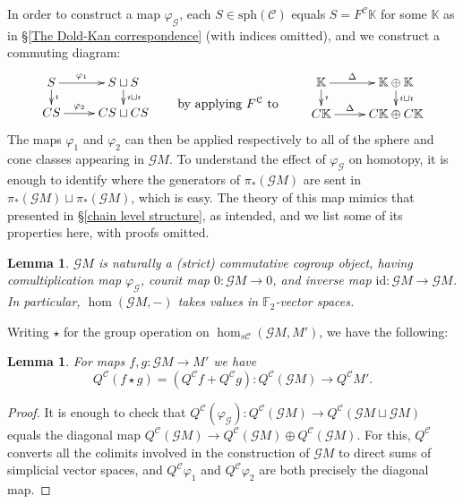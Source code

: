 \documentclass[11pt]{amsart} \renewcommand{\baselinestretch}{1.2}
\theoremstyle{plain}
\newtheorem{lem}[thm]{Lemma}
\theoremstyle{definition}
\newcommand{\DASH}{\mathrm{-}}
\let\phi\varphi
\renewcommand{\to}{\longrightarrow}
\newcommand{\scrG}{\mathscr{G}}
\newcommand{\calV}{\mathcal{V}}
\newcommand{\calc}{\mathcal{C}}
\newcommand{\spheres}[1]{\mathrm{sph}(#1)}
\newcommand{\vect}[2]{\calV^{#1}_{#2}}
\newcommand{\BSW}{{\scrG}}
\newcommand{\F}{\mathbb{F}}
\newcommand{\Id}{\mathrm{id}}
\newcommand{\Ftwo}{\F_2}
\begin{document}
\begin{Composite functor spectral sequences}
In order to construct a map $\phi_\BSW $, each $S\in\spheres{\calc}$ equals $S=F^\calc\mathbb{K}$ for some $\mathbb{K}$ as in \S\ref{The Dold-Kan correspondence} (with indices omitted), and we construct a commuting diagram:
\[\xymatrix@R=4mm{
S\ar[r]^-{\phi_1}
\ar[d]^-{\imath}
&%
S\sqcup S\ar[d]^-{\imath\sqcup\imath}
\\%
CS\ar[r]^-{\phi_2}
&%
CS\sqcup CS%
}\qquad \textup{\raisebox{-6mm}{by applying $F^\calc$ to }}\qquad \xymatrix@R=4mm{
\mathbb{K}\ar[r]^-{\Delta}
\ar[d]^-{\imath}
&%
\mathbb{K}\oplus \mathbb{K}\ar[d]^-{\imath\sqcup\imath}
\\%
C\mathbb{K}\ar[r]^-{\Delta}
&%
C\mathbb{K}\oplus C\mathbb{K}%
}\]
The maps $\phi_1$ and $\phi_2$ can then be applied respectively to all of the sphere and cone classes appearing in $\BSW M$.
To understand the effect of $\phi_{\BSW }$ on homotopy, it is enough to identify where the generators of $\pi_*(\BSW M)$ are sent in $\pi_*(\BSW M)\sqcup\pi_*(\BSW M)$, which is easy. The theory of this map mimics that presented in \S\ref{chain level structure}, as intended, and we list some of its properties here, with proofs omitted.
\begin{lem}
$\BSW M$ is naturally a (strict) commutative cogroup object, having comultiplication map $\phi_{\BSW }$, counit map $0:\BSW M\to 0$, and inverse map $\Id:\BSW M\to \BSW M$. In particular, $\hom(\BSW M,\DASH)$ takes values in $\ensuremath{\Ftwo }$-vector spaces.
\end{lem}
Writing $\star$ for the group operation on $\hom_{s\calc}(\BSW M,M')$, we have the following:
\begin{lem}
For maps $f,g:\BSW M\to M'$ we have 
\[Q^{\calc}(f\star g)=(Q^{\calc}f+Q^{\calc}g):Q^{\calc}(\BSW M)\to Q^{\calc}M'.\]
\end{lem}
\begin{proof}
It is enough to check that $Q^{\calc}(\phi_\BSW ):Q^{\calc}(\BSW M)\to Q^{\calc}(\BSW M\sqcup \BSW M)$ equals the diagonal map $Q^{\calc}(\BSW M)\to Q^{\calc}(\BSW M)\oplus Q^{\calc}(\BSW M)$. For this, $Q^{\calc}$ converts all the colimits involved in the construction of $\BSW M$ to direct sums of simplicial vector spaces, and $Q^{\calc}\phi_1$ and $Q^{\calc}\phi_2$ are both precisely the diagonal map.
\end{proof}


\end{Composite functor spectral sequences}
\end{document}
